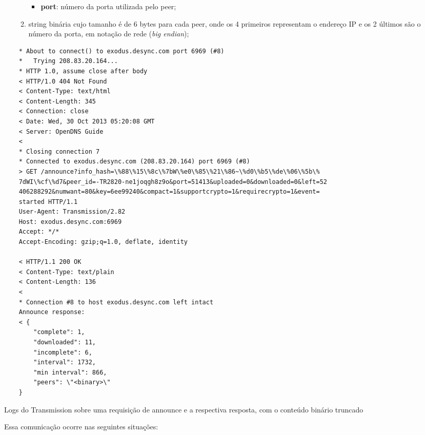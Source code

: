\begin{itemize}
\begin{enumerate}
\begin{itemize}
            \item \textbf{port}: número da porta utilizada pelo \gls*{peer};
        \end{itemize}

        \item \gls*{string} binária cujo tamanho é de 6 bytes para cada \gls*{peer},
        onde os 4 primeiros representam o endereço IP e os 2 últimos são o número da
        porta, em notação de rede (\emph{big endian});
    \end{enumerate}
\end{itemize}

\begin{listing}[H]
    \begin{verbatim}
    * About to connect() to exodus.desync.com port 6969 (#8)
    *   Trying 208.83.20.164...
    * HTTP 1.0, assume close after body
    < HTTP/1.0 404 Not Found
    < Content-Type: text/html
    < Content-Length: 345
    < Connection: close
    < Date: Wed, 30 Oct 2013 05:20:08 GMT
    < Server: OpenDNS Guide
    <
    * Closing connection 7
    * Connected to exodus.desync.com (208.83.20.164) port 6969 (#8)
    > GET /announce?info_hash=\%88\%15\%8c\%7bW\%e0\%85\%21\%86~\%d0\%b5\%de\%06\%5b\%
    7dWI\%cf\%d7&peer_id=-TR2820-ne1joqgh8z9o&port=51413&uploaded=0&downloaded=0&left=52
    406288292&numwant=80&key=6ee99240&compact=1&supportcrypto=1&requirecrypto=1&event=
    started HTTP/1.1
    User-Agent: Transmission/2.82
    Host: exodus.desync.com:6969
    Accept: */*
    Accept-Encoding: gzip;q=1.0, deflate, identity

    < HTTP/1.1 200 OK
    < Content-Type: text/plain
    < Content-Length: 136
    <
    * Connection #8 to host exodus.desync.com left intact
    Announce response:
    < {
        "complete": 1,
        "downloaded": 11,
        "incomplete": 6,
        "interval": 1732,
        "min interval": 866,
        "peers": \"<binary>\"
    }
    \end{verbatim}

    \caption{Logs do Transmission sobre uma requisição de announce e a respectiva
    resposta, com o conteúdo binário truncado}
    \label{lst:announce}
\end{listing}

Essa comunicação ocorre nas seguintes situações:

